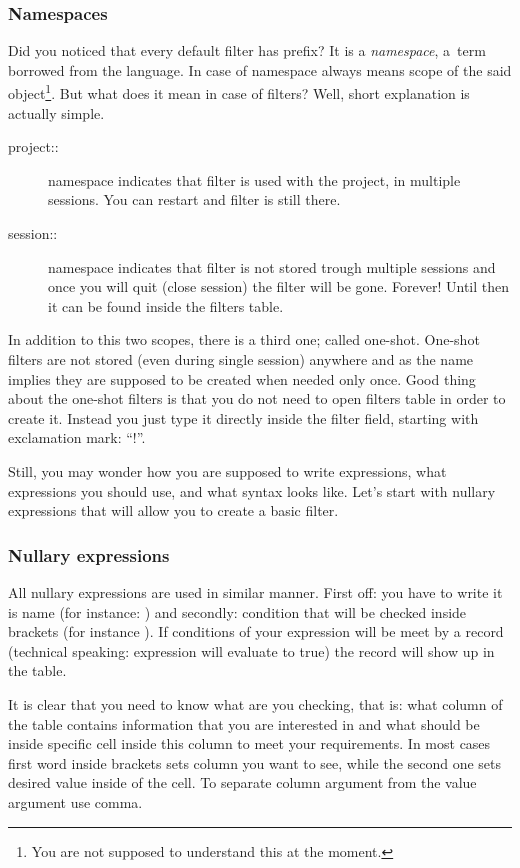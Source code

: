 \subsubsection{Namespaces}
Did you noticed that every default filter has  prefix? It is a \textit{namespace}, a~term borrowed from the \CPP{} language.
In case of \OCS{} namespace always means scope of the said object\footnote{You are not supposed to understand this at the moment.}.
But what does it mean in case of filters? Well, short explanation is actually simple.
\begin{description}
 \item[project::] namespace indicates that filter is used with the project, in multiple sessions. You can restart \OCS{} and filter
 is still there.
 \item[session::] namespace indicates that filter is not stored trough multiple sessions and once you will quit \OCS{} (close session)
 the filter will be gone. Forever! Until then it can be found inside the filters table.
\end{description}
In addition to this two scopes, there is a third one; called one-shot. One-shot filters are not stored (even during single session)
anywhere and as the name implies they are supposed to be created when needed only once. Good thing about the one-shot filters is that
you do not need to open filters table in order to create it. Instead you just type it directly inside the filter field, starting with
exclamation mark: ``!''.

Still, you may wonder how you are supposed to write expressions, what expressions you should use, and what syntax looks like. Let's start
with nullary expressions that will allow you to create a basic filter.

\subsubsection{Nullary expressions}
All nullary expressions are used in similar manner. First off: you have to write it is name (for instance: ) and secondly:
condition that will be checked inside brackets (for instance ). If conditions of your expression will be meet
by a record (technical speaking: expression will evaluate to true) the record will show up in the table.

It is clear that you need to know what are you checking, that is: what column of the table contains information that you are interested
in and what should be inside specific cell inside this column to meet your requirements. In most cases first word inside brackets sets column
you want to see, while the second one sets desired value inside of the cell. To separate column argument from the value argument use comma.

